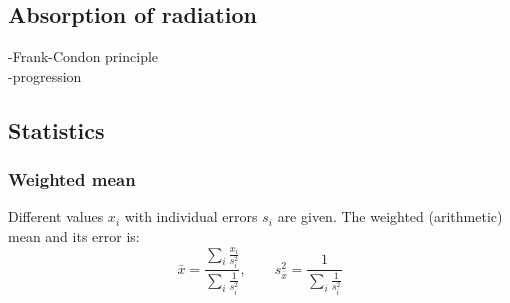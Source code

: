 \subsection{Absorption of radiation}
-Frank-Condon principle \\
-progression

\subsection{Statistics}
\subsubsection{Weighted mean}
Different values $x_i$ with individual errors $s_i$ are given. The weighted (arithmetic) mean and its error is:
\begin{equation}
\label{eq:meanw}
  \bar{x} = \frac{\sum_i \frac{x_i}{s_i^2}}{\sum_i \frac{1}{s_i^2}}, \qquad s_{\bar{x}}^2 = \frac{1}{\sum_i \frac{1}{s_i^2}}
\end{equation}